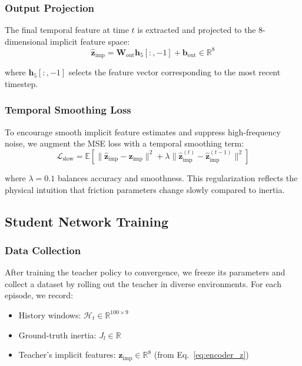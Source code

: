 \documentclass[lettersize,journal]{IEEEtran}
\begin{document}
\subsubsection{Output Projection}

The final temporal feature at time $t$ is extracted and projected to the 8-dimensional implicit feature space:
\begin{equation}
\hat{\bm{z}}_{\text{imp}} = \bm{W}_{\text{out}} \bm{h}_5[:, -1] + \bm{b}_{\text{out}} \in \mathbb{R}^8 \label{eq:slow_output}
\end{equation}

\noindent where $\bm{h}_5[:, -1]$ selects the feature vector corresponding to the most recent timestep.

\subsubsection{Temporal Smoothing Loss}

To encourage smooth implicit feature estimates and suppress high-frequency noise, we augment the MSE loss with a temporal smoothing term:
\begin{equation}
\mathcal{L}_{\text{slow}} = \mathbb{E} \left[ \|\hat{\bm{z}}_{\text{imp}} - \bm{z}_{\text{imp}}\|^2 + \lambda \|\hat{\bm{z}}_{\text{imp}}^{(t)} - \hat{\bm{z}}_{\text{imp}}^{(t-1)}\|^2 \right] \label{eq:slow_loss}
\end{equation}

\noindent where $\lambda = 0.1$ balances accuracy and smoothness. This regularization reflects the physical intuition that friction parameters change slowly compared to inertia.

\subsection{Student Network Training}

\subsubsection{Data Collection}

After training the teacher policy to convergence, we freeze its parameters and collect a dataset by rolling out the teacher in diverse environments. For each episode, we record:
\begin{itemize}
\item History windows: $\mathcal{H}_t \in \mathbb{R}^{100 \times 9}$
\item Ground-truth inertia: $J_l \in \mathbb{R}$
\item Teacher's implicit features: $\bm{z}_{\text{imp}} \in \mathbb{R}^8$ (from Eq.~\ref{eq:encoder_z})
\end{itemize}
\end{document}
